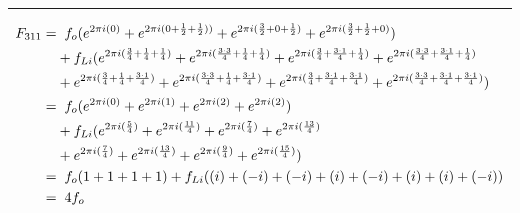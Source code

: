 \documentclass{article}
\begin{document}
\noindent\rule{12cm}{0.4pt}
\begin{align*}
	F_{311} =& \hspace{0.2cm}  f_{o}  (e^{2 \pi i (0)} 
	+ e^{2 \pi i (0 + \frac{1}{2} + \frac{1}{2}))} 
	+ e^{2 \pi i (\frac{3}{2} + 0 + \frac{1}{2})} 
	+ e^{2 \pi i (\frac{3}{2} + \frac{1}{2} + 0)})  \\
	&+ f_{Li} (e^{2 \pi i (\frac{3}{4} + \frac{1}{4} + \frac{1}{4})}  
	+ e^{2 \pi i (\frac{3 \cdot 3}{4} + \frac{1}{4} + \frac{1}{4})} 
	+ e^{2 \pi i (\frac{3}{4} + \frac{3 \cdot 1}{4} + \frac{1}{4})} 
	+ e^{2 \pi i (\frac{3 \cdot 3}{4} + \frac{3 \cdot 1}{4} + \frac{1}{4})} \\
	&+ e^{2 \pi i (\frac{3}{4} + \frac{1}{4} + \frac{3 \cdot 1}{4})}
	+ e^{2 \pi i (\frac{3 \cdot 3}{4} + \frac{1}{4} + \frac{3 \cdot 1}{4})} 
	+ e^{2 \pi i (\frac{3}{4} + \frac{3 \cdot 1}{4} + \frac{3 \cdot 1}{4})} 
	+ e^{2 \pi i (\frac{3 \cdot 3}{4} + \frac{3 \cdot 1}{4} + \frac{3 \cdot 1}{4})}) \\  
	=& \hspace{0.2cm}  f_{o}  (e^{2 \pi i (0)} 
	+ e^{2 \pi i (1)} 
	+ e^{2 \pi i (2)} 
	+ e^{2 \pi i (2)})  \\
	&+ f_{Li} (e^{2 \pi i (\frac{5}{4})}  
	+ e^{2 \pi i (\frac{11}{4})} 
	+ e^{2 \pi i (\frac{7}{4})} 
	+ e^{2 \pi i (\frac{13}{4})} \\
	&+ e^{2 \pi i (\frac{7}{4})}
	+ e^{2 \pi i (\frac{13}{4})} 
	+ e^{2 \pi i (\frac{9}{4})} 
	+ e^{2 \pi i (\frac{15}{4})}) \\
	=& \hspace{0.2cm}  f_{o}  (1  + 1 + 1 + 1) + f_{Li}((i) + (-i) + (-i) + (i) + (-i) + (i) + (i) + (-i)) \\
	=& \hspace{0.2cm} 4f_{o} 
\end{align*}
\end{document}
